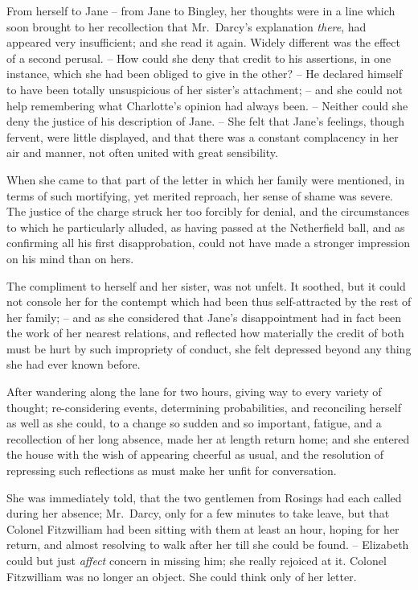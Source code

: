 From herself to Jane -- from Jane to Bingley, her
thoughts were in a line which soon brought to her recollection
that Mr.\ Darcy’s explanation \textit{there}, had appeared
very insufficient; and she read it again. Widely different
was the effect of a second perusal. -- How could she deny
that credit to his assertions, in one instance, which she
had been obliged to give in the other? -- He declared
himself to have been totally unsuspicious of her sister’s
attachment; -- and she could not help remembering what
Charlotte’s opinion had always been. -- Neither could she
deny the justice of his description of Jane. -- She felt that
Jane’s feelings, though fervent, were little displayed, and
that there was a constant complacency in her air and
manner, not often united with great sensibility.

When she came to that part of the letter in which
her family were mentioned, in terms of such mortifying,
yet merited reproach, her sense of shame was severe.
The justice of the charge struck her too forcibly for denial,
and the circumstances to which he particularly alluded,
as having passed at the Netherfield ball, and as confirming
all his first disapprobation, could not have made a stronger
impression on his mind than on hers.

The compliment to herself and her sister, was not
unfelt. It soothed, but it could not console her for the
contempt which had been thus self-attracted by the rest
of her family; -- and as she considered that Jane’s disappointment
had in fact been the work of her nearest
relations, and reflected how materially the credit of both
must be hurt by such impropriety of conduct, she felt
depressed beyond any thing she had ever known before.

After wandering along the lane for two hours, giving
way to every variety of thought; re-consider\-ing events,
determining probabilities, and reconciling herself as well
as she could, to a change so sudden and so important,
fatigue, and a recollection of her long absence, made her
at length return home; and she entered the house with
the wish of appearing cheerful as usual, and the resolution
of repressing such reflections as must make her unfit for
conversation.

She was immediately told, that the two gentlemen from
Rosings had each called during her absence; Mr.\ Darcy,
only for a few minutes to take leave, but that Colonel
Fitzwilliam had been sitting with them at least an hour,
hoping for her return, and almost resolving to walk after
her till she could be found. -- Elizabeth could but just
\textit{affect} concern in missing him; she really rejoiced at it.
Colonel Fitzwilliam was no longer an object. She could
think only of her letter.

